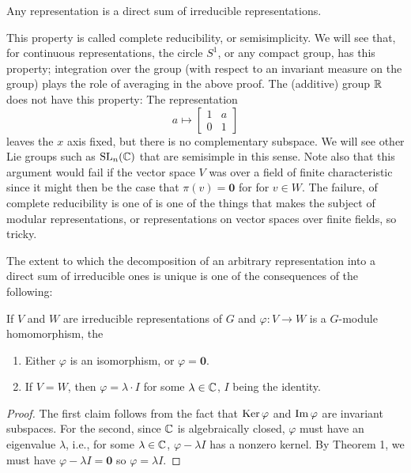 \begin{corollary}
  Any representation is a direct sum of irreducible representations.
\end{corollary}

This property is called complete reducibility, or semisimplicity. We will
see that, for continuous representations, the circle $S^1$, or any compact
group, has this property; integration over the group (with respect to an
invariant measure on the group) plays the role of averaging in the above
proof. The (additive) group $\mathbb{R}$ does not have this property: The
representation
\[
  a\longmapsto
  \begin{bmatrix}
    1&a\\0&1
  \end{bmatrix}
\]
leaves the $x$ axis fixed, but there is no complementary subspace. We will
see other Lie groups such as $\mathrm{SL}_n(\mathbb{C})$ that are semisimple in this
sense. Note also that this argument would fail if the vector space $V$ was
over a field of finite characteristic since it might then be the case that
$\pi(v)=\mathbf{0}$ for for $v\in W$. The failure, of complete
reducibility is one  of is one of the things that makes the subject of
modular representations, or representations on vector spaces over finite
fields, so tricky.

The extent to which the decomposition of an arbitrary representation into a
direct sum of irreducible ones is unique is one of the consequences of the
following:

\begin{theorem}
  If $V$ and $W$ are irreducible representations of $G$ and $\varphi\colon
  V\to W$ is a $G$-module homomorphism, the
  \begin{enumerate}[label=\textnormal{(\alph*)},noitemsep]
  \item Either $\varphi$ is an isomorphism, or $\varphi=\mathbf{0}$.
  \item If $V=W$, then $\varphi=\lambda\cdot I$ for some $\lambda\in\mathbb{C}$,
    $I$ being the identity.
  \end{enumerate}
\end{theorem}
\begin{proof}
  The first claim follows from the fact that $\operatorname{Ker}\varphi$ and
  $\operatorname{Im}\varphi$ are invariant subspaces. For the second, since $\mathbb{C}$ is
  algebraically closed, $\varphi$ must have an eigenvalue $\lambda$, i.e.,
  for some $\lambda\in\mathbb{C}$, $\varphi-\lambda I$ has a nonzero kernel. By
  Theorem 1, we must have $\varphi-\lambda I=\mathbf{0}$ so $\varphi=\lambda I$.
\end{proof}

